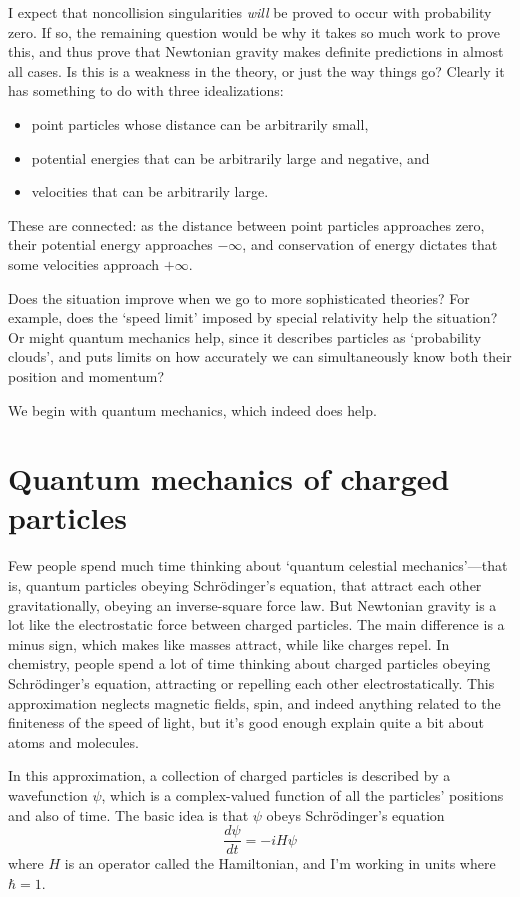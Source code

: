 \documentclass[12pt]{article}
\begin{document}
I expect that noncollision singularities \emph{will} be proved to occur with probability zero.  If so, the remaining question would be why it takes so much work to prove this, and thus prove that Newtonian gravity makes definite predictions in almost all cases.  Is this is a weakness in the theory, or just the way things go?   Clearly it has something to do with three idealizations:
\begin{itemize} 
\item point particles whose distance can be arbitrarily small,
\item potential energies that can be arbitrarily large and negative, and 
\item velocities that can be arbitrarily large.
\end{itemize}  
These are connected: as the distance between point particles approaches zero, their potential energy approaches $-\infty$, and conservation of energy dictates that some velocities approach $+\infty$.  

Does the situation improve when we go to more sophisticated theories?  For example, does the `speed limit' imposed by special relativity help the situation?  Or might quantum mechanics help, since it describes particles as `probability clouds', and puts limits on how accurately we can simultaneously know both their position and momentum?

We begin with quantum mechanics, which indeed does help.

\section{Quantum mechanics of charged particles}
\label{quantum}

Few people spend much time thinking about `quantum celestial mechanics'---that is, quantum particles obeying Schr\"odinger's equation, that attract each other gravitationally, obeying an inverse-square force law.   But Newtonian gravity is a lot like the electrostatic force between charged particles.  The main difference is a minus sign, which makes like masses attract, while like charges repel.  In chemistry, people spend a lot of time thinking about charged particles obeying Schr\"odinger's equation, attracting or repelling each other electrostatically.  This approximation neglects magnetic fields, spin, and indeed anything related to the finiteness of the speed of light, but it's good enough explain quite a bit about atoms and molecules.

In this approximation, a collection of charged particles is described by a 
wavefunction $\psi$, which is a complex-valued function of all the particles' positions 
and also of time.   The basic idea is that $\psi$ obeys Schr\"odinger's
equation
\[ \frac{d \psi}{dt} = - i H \psi \]
where $H$ is an operator called the Hamiltonian, and I'm working in units where $\hbar = 1$.  
\end{document}
